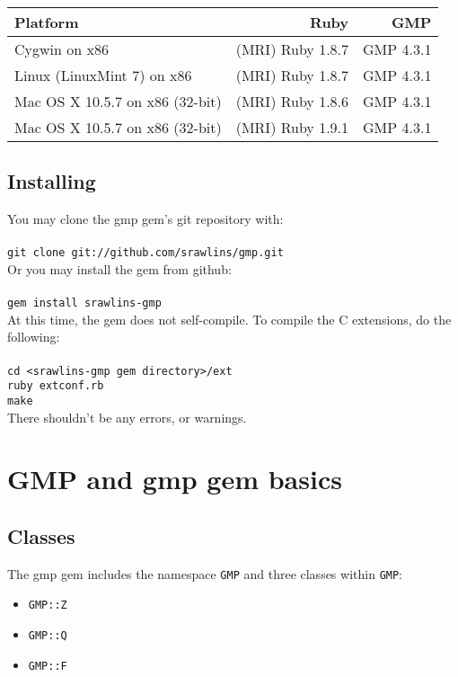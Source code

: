 \documentclass[pdftex,10pt]{article}
\begin{document}
\begin{tabular}{|l|r|r|} \hline \hline
             Platform             &       Ruby       &    GMP    \\ \hline
  Cygwin on x86                   & (MRI) Ruby 1.8.7 & GMP 4.3.1 \\ \hline
  Linux (LinuxMint 7) on x86      & (MRI) Ruby 1.8.7 & GMP 4.3.1 \\ \hline
  Mac OS X 10.5.7 on x86 (32-bit) & (MRI) Ruby 1.8.6 & GMP 4.3.1 \\ \hline
  Mac OS X 10.5.7 on x86 (32-bit) & (MRI) Ruby 1.9.1 & GMP 4.3.1 \\ \hline
\end{tabular}

\subsection{Installing}
You may clone the gmp gem's git repository with:\\\\

\hangindent=0.5cm \texttt{git clone git://github.com/srawlins/gmp.git}\\

Or you may install the gem from github:\\\\

\hangindent=0.5cm \texttt{gem install srawlins-gmp}\\

At this time, the gem does not self-compile. To compile the C extensions, do
the following:\\\\

\hangindent=0.5cm \texttt{cd <srawlins-gmp gem directory>/ext}\\
\hangindent=0.5cm \texttt{ruby extconf.rb}\\
\hangindent=0.5cm \texttt{make}\\

There shouldn't be any errors, or warnings.

\section{GMP and gmp gem basics}

\subsection{Classes}
The gmp gem includes the namespace \texttt{GMP} and three classes within \texttt{GMP}:
\begin{itemize}
  \item \texttt{GMP::Z}
  \item \texttt{GMP::Q}
  \item \texttt{GMP::F}
\end{itemize}
\end{document}
